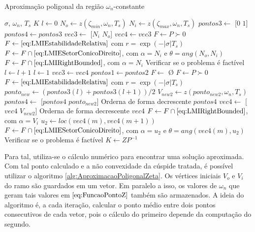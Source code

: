 \begin{algorithm}[ht!]
  \caption{Aproximação poligonal da região $\omega_n$-constante}\label{alg:AproximacaoPoligonalWn}
  \begin{algorithmic}[1]
    \Require $\sigma$, $\omega_n$, $T_s$
    \Ensure $K$
    \State $l \gets 0$
    \State $N_o \gets z(\zeta_{min},\omega_n,T_s)$
    \State $N_i \gets z(\zeta_{max},\omega_n,T_s)$
    \State $pontos3 \gets$ [$0$ $1$]
    \State $pontos4 \gets pontos3$
    \State $vec3 \gets$ [$N_i$ $N_o$]
    \State $vec4 \gets vec3$
    \State $F \gets P \succ 0$
    \State $F \gets \eqref{eq:LMIEstabilidadeRelativa}$ com $r = \exp{\left(-|\sigma|T_s\right)}$ 
    \State $F \gets F \cap \eqref{eq:LMIESetorConicoDireito}$, com $\alpha = N_i$ e $\theta = ang(N_o,N_i)$ 
    \State $F \gets F \cap \eqref{eq:LMIRightBounded}$, com $\alpha = N_i$ 
    \State Verificar se o problema é factível
        \State $l \gets l + 1$
      \Else
        \State $l \gets 1$
        \State $vec3 \gets vec4$
        \State $pontos1 \gets pontos2$
      \EndIf
        \State $F \gets$ \O {}
        \State $F \gets P \succ 0$
        \State $F \gets \eqref{eq:LMIEstabilidadeRelativa}$ com $r = \exp{\left(-|\sigma|T_s\right)}$ 
        \State $ponto_{new} \gets (pontos3(l)+pontos3(l+1))/2$
        \State $V_{new2} \gets z(ponto_{new2}, \omega_n, T_s)$
        \State $pontos4 \gets$ [$pontos4$ $ponto_{new2}$]
        \State Orderna de forma decrescente $pontos4$
        \State $vec4 \gets$ [$vec4$ $V_{new2}$]
        \State Orderna de forma decrescente $vec4$
        \State $F \gets F \cap \eqref{eq:LMIRightBounded}$, com $\alpha = V_i$ 
          \State $u_2 \gets loc(vec4(m),vec4(m+1))$
          \State $F \gets F \cap \eqref{eq:LMIESetorConicoDireito}$, com $\alpha = u_2$ e $\theta = ang(vec4(m),u_2)$
        \EndFor
        \State Verificar se o problema é factível
    \EndWhile
    \State $K \gets ZP^{-1}$
  \end{algorithmic}
\end{algorithm}

Para tal, utiliza-se o cálculo numérico para encontrar uma solução aproximada. Com tal ponto calculado e a não convexidade da cúspide tratada, é possível utilizar o algoritmo \ref{alg:AproximacaoPoligonalZeta}. Os vértices iniciais $V_o$ e $V_i$ do ramo são guardados em um vetor. Em paralelo a isso, os valores de $\omega_n$ que geram tais valores em $\eqref{eq:FuncaoPontoZ}$ também são armazenados. A ideia do algoritmo é, a cada iteração, calcular o ponto médio entre dois pontos consecutivos de cada vetor, pois o cálculo do primeiro depende da computação do segundo.

